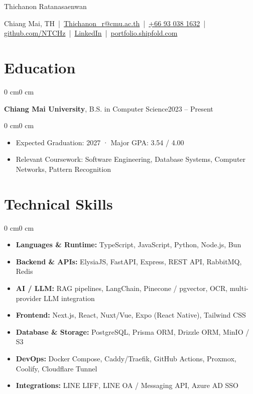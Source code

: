 \documentclass[10pt, letterpaper]{article}
\newenvironment{highlights}{
    \begin{itemize}[
        topsep=0.06 cm,
        parsep=0.06 cm,
        itemsep=0pt,
        leftmargin=0 cm + 10pt
    ]
}{
    \end{itemize}
}
\newenvironment{onecolentry}{
    \begin{adjustwidth}{0 cm}{0 cm}
}{
    \end{adjustwidth}
}
\newcommand{\datedentry}[2]{%
  \begin{onecolentry}
    \noindent #1\hfill #2%
  \end{onecolentry}
}
\newenvironment{header}{
    \centering\linespread{1.15}
}{
}
\begin{document}
\begin{header}
    \fontsize{22 pt}{22 pt}\selectfont Thichanon Ratanasaenwan

    \vspace{5 pt}

    \small
    Chiang Mai, TH \,|\,
    \href{mailto:Thichanon_r@cmu.ac.th}{Thichanon\_r@cmu.ac.th} \,|\,
    \href{tel:+66-93-038-1632}{+66 93 038 1632} \,|\,
    \href{https://github.com/NTCHz}{github.com/NTCHz} \,|\,
    \href{https://www.linkedin.com/in/thichanon-ratanasaenwan/}{LinkedIn} \,|\,
    \href{https://portfolio.shipfold.com}{portfolio.shipfold.com}
\end{header}

\vspace{2 pt}

\section{Education}
\datedentry{\textbf{Chiang Mai University}, B.S. in Computer Science}{2023 -- Present}

\vspace{0.10 cm}
\begin{onecolentry}
    \begin{highlights}
        \item Expected Graduation: 2027 · Major GPA: 3.54 / 4.00
        \item Relevant Coursework: Software Engineering, Database Systems, Computer Networks, Pattern Recognition
    \end{highlights}
\end{onecolentry}

\section{Technical Skills}

\begin{onecolentry}
\begin{highlights}
  \item \textbf{Languages \& Runtime:} TypeScript, JavaScript, Python, Node.js, Bun
  \item \textbf{Backend \& APIs:} ElysiaJS, FastAPI, Express, REST API, RabbitMQ, Redis
  \item \textbf{AI / LLM:} RAG pipelines, LangChain, Pinecone / pgvector, OCR, multi-provider LLM integration
  \item \textbf{Frontend:} Next.js, React, Nuxt/Vue, Expo (React Native), Tailwind CSS
  \item \textbf{Database \& Storage:} PostgreSQL, Prisma ORM, Drizzle ORM, MinIO / S3
  \item \textbf{DevOps:} Docker Compose, Caddy/Traefik, GitHub Actions, Proxmox, Coolify, Cloudflare Tunnel
  \item \textbf{Integrations:} LINE LIFF, LINE OA / Messaging API, Azure AD SSO
\end{highlights}
\end{onecolentry}
\end{document}
